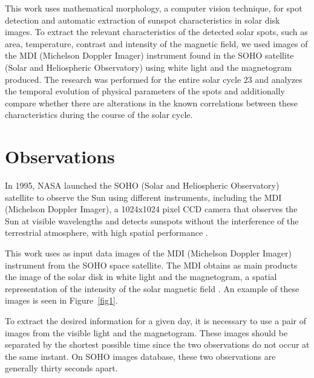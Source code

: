 \documentclass[namedreferences]{solarphysics}
\begin{document}
\begin{article}
This work uses mathematical morphology,
a computer vision technique, 
for spot detection and automatic extraction of sunspot characteristics in solar disk images.
To extract the relevant characteristics of the detected solar spots, such as area, temperature, 
contrast and intensity of the magnetic field, we used images of the MDI (Michelson Doppler Imager)
instrument found in the SOHO satellite (Solar and Heliospheric Observatory)
using white light and the magnetogram produced.
The research was performed for the entire solar cycle 23 and analyzes the temporal evolution of physical
parameters of the spots and additionally compare whether there are alterations in the known correlations 
between these characteristics during the course of the solar cycle.

\section{Observations}
\label{S-obs}
In 1995, NASA launched the SOHO (Solar and Heliospheric Observatory) satellite to observe the Sun using different instruments, including the MDI (Michelson Doppler Imager),
a 1024x1024 pixel CCD camera that observes the Sun at visible wavelengths and detects sunspots without the interference of the terrestrial atmosphere, with high spatial performance \citep{scherrer1991}.

This work uses as input data images of the MDI (Michelson Doppler Imager) instrument from the SOHO space satellite.
The MDI obtains as main products the image of the solar disk in white light and the magnetogram, a spatial representation of the intensity of the solar magnetic field \citep{scherrer1991}.
An example of these images is seen in Figure~\ref{fig1}.

To extract the desired information for a given day, 
it is necessary to use a pair of images from the visible light and the magnetogram.
These images should be separated by the shortest possible time since the two observations do not occur at the same instant.
On SOHO images database, these two observations are generally thirty seconds apart.
  

\end{article}
\end{document}
